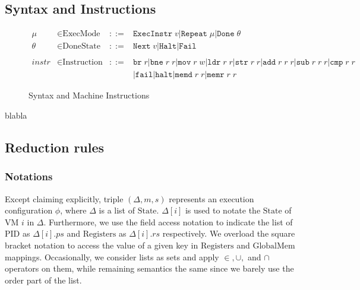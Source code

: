 \documentclass[a4paper]{article}
\newcommand*{\derived}{::=}
\newcommand*{\STATE}{\text{State}}
\newcommand*{\MEM}{\text{GlobalMem}}
\newcommand*{\PID}{\text{PID}}
\newcommand*{\REGS}{\text{Registers}}
\newcommand*{\MODE}{\text{ExecMode}}
\newcommand*{\DONE}{\text{DoneState}}
\newcommand*{\INSTR}{\text{Instruction}}
\newcommand*{\instrm}[1]{\mathtt{#1}}
\newcommand*{\NXT}[1]{\mathtt{Next} \; {#1}}
\begin{document}
\subsection{Syntax and Instructions}
\begin{figure}[h!]
  \begin{align*}
    \mu &\in \MODE &\derived & \mathtt{ExecInstr} \; v | \mathtt{Repeat} \; \mu | \mathtt{Done} \; \theta \\
    \theta &\in \DONE &\derived & \NXT{v} | \mathtt{Halt} | \mathtt{Fail}\\
    \\
    instr & \in  \INSTR &\derived & \instrm{br} \; r |\instrm{bne} \; r \; r |
                                    \instrm{mov} \; r \; w | \instrm{ldr} \; r\; r|
                                    \instrm{str} \; r \; r | \instrm{add} \; r \; r \; r |
                                    \instrm{sub} \; r \; r \; r | \instrm{cmp} \; r \; r \\
        & & & | \instrm{fail} | \instrm{halt} | \instrm{memd} \; r \; r | \instrm{memr} \; r\; r
  \end{align*}
  \caption{Syntax and Machine Instructions}
\end{figure}
 blabla



\subsection{Reduction rules}
\subsubsection{Notations}
Except claiming explicitly, triple $(\Delta, m, s)$ represents an execution
configuration $\phi$, where $\Delta$ is a list of $\STATE$. $\Delta[i]$ is used
to notate the $\STATE$ of VM $i$ in $\Delta$. Furthermore, we use the field
access notation to indicate the list of $\PID$ as $\Delta[i].ps$ and $\REGS$ as
$\Delta[i].rs$ respectively. We overload the square bracket notation to access
the value of a given key in $\REGS$ and $\MEM$ mappings. Occasionally, we
consider lists as sets and apply $\in, \cup,$ and $\cap$ operators on them,
while remaining semantics the same since we barely use the order part of the
list.
\end{document}
